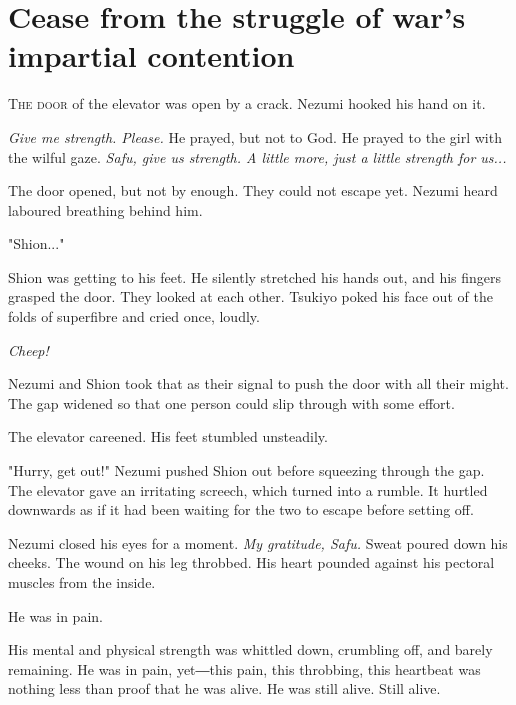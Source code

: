 
\chapter{Cease from the struggle of war's impartial contention}


\lettrine{T}{he door} of the elevator was open by a crack. Nezumi hooked his hand on
it.

\emph{Give me strength. Please.} He prayed, but not to God. He prayed to the
girl with the wilful gaze. \emph{Safu, give us strength. A little more, just a
little strength for us...}

The door opened, but not by enough. They could not escape yet. Nezumi
heard laboured breathing behind him.

"Shion..."

Shion was getting to his feet. He silently stretched his hands out, and
his fingers grasped the door. They looked at each other. Tsukiyo poked
his face out of the folds of superfibre and cried once, loudly.

\emph{Cheep!}

Nezumi and Shion took that as their signal to push the door with all
their might. The gap widened so that one person could slip through with
some effort.

The elevator careened. His feet stumbled unsteadily.

"Hurry, get out!" Nezumi pushed Shion out before squeezing through the
gap. The elevator gave an irritating screech, which turned into a
rumble. It hurtled downwards as if it had been waiting for the two to
escape before setting off.

Nezumi closed his eyes for a moment. \emph{My gratitude, Safu.} Sweat poured
down his cheeks. The wound on his leg throbbed. His heart pounded
against his pectoral muscles from the inside.

He was in pain.

His mental and physical strength was whittled down, crumbling off, and
barely remaining. He was in pain, yet―this pain, this throbbing, this
heartbeat was nothing less than proof that he was alive. He was still
alive. Still alive.

